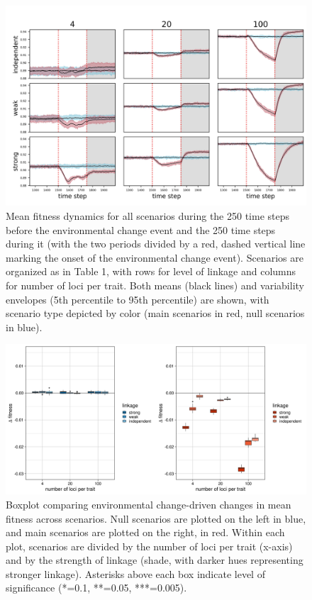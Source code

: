 \documentclass[9pt,twocolumn,twoside,lineno]{pnas-new}
\begin{document}
\begin{figure}
\centering
\includegraphics[width=11.4cm]{fit_over_time.jpg}
\caption{Mean fitness dynamics for all scenarios during the 250 time steps before the environmental change event and the 250 time steps during it (with the two periods divided by a red, dashed vertical line marking the onset of the environmental change event). Scenarios are organized as in Table 1, with rows for level of linkage and columns for number of loci per trait. Both means (black lines) and variability envelopes (5th percentile to 95th percentile) are shown, with scenario type depicted by color (main scenarios in red, null scenarios in blue).}
\label{fig:fit_over_time}
\end{figure}

\begin{figure}
\centering
\includegraphics[width=11.4cm]{fit_boxplot.jpg}
\caption{Boxplot comparing environmental change-driven changes in mean fitness across scenarios. Null scenarios are plotted on the left in blue, and main scenarios are plotted on the right, in red. Within each plot, scenarios are divided by the number of loci per trait (x-axis) and by the strength of linkage (shade, with darker hues representing stronger linkage). Asterisks above each box indicate level of significance (*=0.1, **=0.05, ***=0.005).}
\label{fig:fit_boxplot}
\end{figure}
\end{document}
